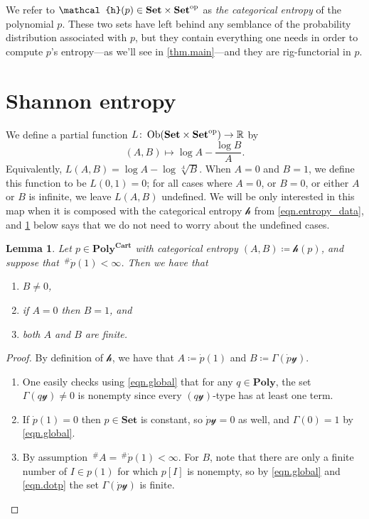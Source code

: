 \documentclass[11pt, one side, article]{memoir}
\theoremstyle{definition}
\theoremstyle{plain}
\newtheorem{lemma}[definitionx]{Lemma}
\DeclareMathOperator{\ob}{Ob}
\newcommand{\Cat}[1]{\mathbf{#1}}%
\newcommand{\card}{\,^{\#}}
\newcommand{\op}{^\tn{op}}
\newcommand{\tn}[1]{\textnormal{#1}}
\newcommand{\rr}{\mathbb{R}}
\newcommand{\smset}{\Cat{Set}}
\newcommand{\yon}{\mathcal{y}}
\newcommand{\poly}{\Cat{Poly}}
\newcommand{\polycart}{\poly^{\Cat{Cart}}}
\newcommand{\hh}{\mathcal{h}}
\newcommand{\0}{\textsf{0}}
\newcommand{\1}{\tn{\textsf{1}}}
\begin{document}
We refer to $\hh(p)\in\smset\times\smset\op$ as \emph{the categorical entropy} of the polynomial $p$. These two sets have left behind any semblance of the probability distribution associated with $p$, but they contain everything one needs in order to compute $p$'s entropy---as we'll see in \cref{thm.main}---and they are rig-functorial in $p$. 

\section{Shannon entropy}\label{sec.entropy}

We define a partial function $L\colon\ob(\smset\times\smset\op)\to\rr$ by
\begin{equation}\label{eqn.L}
(A,B)\mapsto \log A-\frac{\log B}{A}.
\end{equation}
Equivalently, $L(A,B)=\log A-\log\sqrt[A]{B}$. When $A=0$ and $B=1$, we define this function to be $L(0,1)=0$; for all cases where $A=0$, or $B=0$, or either $A$ or $B$ is infinite, we leave $L(A,B)$ undefined. We will be only interested in this map when it is composed with the categorical entropy $\mathcal{h}$ from \eqref{eqn.entropy_data}, and \cref{lemma.dontworry} below says that we do not need to worry about the undefined cases.

\begin{lemma}\label{lemma.dontworry}
Let $p\in\polycart$ with categorical entropy $(A,B)\coloneqq\hh(p)$, and suppose that $\card\dot{p}(1)<\infty$. Then we have that
\begin{enumerate}[label=\roman*.]
	\item $B\neq 0$,
	\item if $A=0$ then $B=1$, and
	\item both $A$ and $B$ are finite.
\end{enumerate}
\end{lemma}
\begin{proof}
By definition of $\hh$, we have that $A\coloneqq\dot{p}(1)$ and $B\coloneqq\Gamma(\dot{p}\yon)$. 
\begin{enumerate}[label=\roman*.]
	\item One easily checks using \eqref{eqn.global} that for any $q\in\poly$, the set $\Gamma(q\yon)\neq0$ is nonempty since every $(q\yon)$-type has at least one term. 
	\item If $\dot{p}(1)=0$ then $p\in\smset$ is constant, so $\dot{p}\yon=0$ as well, and $\Gamma(0)=1$ by \eqref{eqn.global}.
	\item By assumption $\card A=\card\dot{p}(1)<\infty$. For $B$, note that there are only a finite number of $I\in p(1)$ for which $p[I]$ is nonempty, so by \eqref{eqn.global} and \eqref{eqn.dotp} the set $\Gamma(\dot{p}\yon)$ is finite.
\qedhere
\end{enumerate}
\end{proof}
\end{document}
